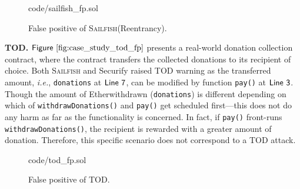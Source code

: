 \documentclass[conference, romanappendices]{tex/IEEEtran}
\theoremstyle{bfnote}
\newcommand{\toolname}{\textsc{Sailfish}\xspace}
\newcommand{\securify}{{\sc Securify}\xspace}
\newcommand{\ether}{{Ether}\xspace}
\newcommand{\ie}{\textit{i.e.}}
\newcommand{\Line}[1]{\ensuremath{\sf Line~ #1}}
\newcommand{\Fig}[1]{\ensuremath{\sf Figure~\ref{#1}}}
\begin{document}
\begin{figure}[h]
	\vspace{-5.5mm}
	
	{code/sailfish_fp.sol}
	\vspace{-6mm}
	\caption{False positive of \toolname (Reentrancy).
		}
	\label{fig:case_study_reentrancy_fp}
	\vspace{-4mm}
\end{figure}

\noindent
\textbf{TOD.} \Fig{fig:case_study_tod_fp} presents a real-world donation collection contract, where the contract transfers the collected donations to its {recipient\EndAccSupp{}} of choice.
Both \toolname and \securify raised {TOD\EndAccSupp{}} warning as the transferred amount, \ie, \texttt{donations} at \Line{7}, can be modified by function \texttt{pay()} at \Line{3}.
Though the amount of \ether {withdrawn\EndAccSupp{}} (\texttt{donations}) is different depending on which of \texttt{withdrawDonations()} and \texttt{pay()} get scheduled first---this does not do any harm as far as the functionality is concerned.
In fact, if \texttt{pay()} front-runs \texttt{withdrawDonations()}, the {recipient\EndAccSupp{}} is {rewarded\EndAccSupp{}} with a greater amount of donation.
Therefore, this specific scenario does not correspond to a {TOD\EndAccSupp{}} attack. 

\begin{figure}[h]
	\vspace{-5.5mm}
	
	{code/tod_fp.sol}
	\vspace{-0.22in}
	\caption{False positive of TOD.
		}
	\label{fig:case_study_tod_fp}
	\vspace{-5mm}
\end{figure}
\end{document}
